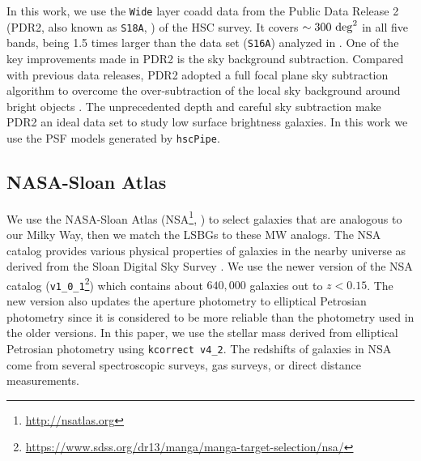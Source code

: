 \documentclass[twocolumn,astrosymb,twocolappendix]{aastex631}
\newcommand{\code}[1]{\texttt{#1}}
\begin{document}
\begin{CJK*}{UTF8}{gbsn}
In this work, we use the \code{Wide} layer coadd data from the Public Data Release 2 (PDR2, also known as \code{S18A}, \citealt{Aihara2018}) of the HSC survey. It covers $\sim 300\ \rm{deg}^2$ in all five bands, being 1.5 times larger than the data set (\code{S16A}) analyzed in \citet{Greco2018}. One of the key improvements made in PDR2 is the sky background subtraction. Compared with previous data releases, PDR2 adopted a full focal plane sky subtraction algorithm to overcome the over-subtraction of the local sky background around bright objects \citep{Aihara2018,Li2021}. The unprecedented depth and careful sky subtraction make PDR2 an ideal data set to study low surface brightness galaxies. In this work we use the PSF models generated by \code{hscPipe}. 


\subsection{NASA-Sloan Atlas}
We use the NASA-Sloan Atlas (NSA\footnote{\url{http://nsatlas.org}}, \citealt{Blanton2005,Blanton2011}) to select galaxies that are analogous to our Milky Way, then we match the LSBGs to these MW analogs. The NSA catalog provides various physical properties of galaxies in the nearby universe as derived from the Sloan Digital Sky Survey \citep[SDSS,][]{York2000}. We use the newer version of the NSA catalog (\code{v1\_0\_1}\footnote{\url{https://www.sdss.org/dr13/manga/manga-target-selection/nsa/}}) which contains about $640,000$ galaxies out to $z < 0.15$. The new version also updates the aperture photometry to elliptical Petrosian photometry since it is considered to be more reliable than the photometry used in the older versions. In this paper, we use the stellar mass derived from elliptical Petrosian photometry using \code{kcorrect v4\_2}. The redshifts of galaxies in NSA come from several spectroscopic surveys, gas surveys, or direct distance measurements. 


\end{CJK*}
\end{document}
